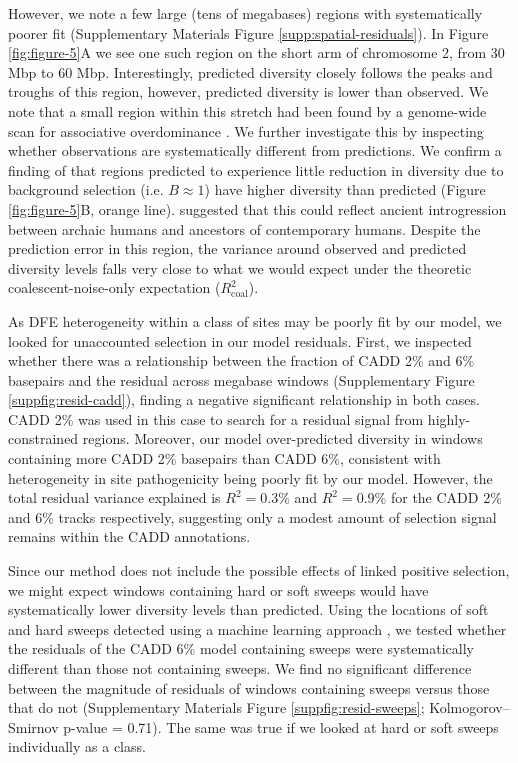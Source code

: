 \documentclass[11pt]{article}
\begin{document}
However, we note a few large (tens of megabases) regions with systematically poorer fit
(Supplementary Materials Figure \ref{supp:spatial-residuals}). In Figure
\ref{fig:figure-5}A we see one such region on the short arm of chromosome 2,
from 30 Mbp to 60 Mbp. Interestingly, predicted diversity closely follows the
peaks and troughs of this region, however, predicted diversity is lower than observed. We note that a small region within this stretch had been found by a genome-wide scan for associative overdominance \parencite{Gilbert2020-aw}. We further investigate this by inspecting whether observations are systematically different from predictions. We confirm a finding of \textcite{Murphy2022-sj} that regions predicted to experience little reduction in diversity due to background selection (i.e. $B\approx 1$) have higher diversity than predicted (Figure \ref{fig:figure-5}B, orange line). \textcite{Murphy2022-sj} suggested that this could reflect ancient introgression between archaic humans and ancestors of contemporary humans. Despite the prediction error in this region, the variance around observed and predicted diversity levels falls very close to what we would expect under the theoretic coalescent-noise-only expectation ($R_\text{coal}^2$).

As DFE heterogeneity within a class of sites may be poorly fit by our model,
we looked for unaccounted selection in our model residuals. First, we
inspected whether there was a relationship between the fraction of CADD 2\% and 6\% basepairs and the residual across megabase windows (Supplementary Figure
\ref{suppfig:resid-cadd}), finding a negative significant relationship in
both cases. CADD 2\% was used in this case to search for a residual signal from highly-constrained regions. Moreover, our model over-predicted diversity in windows containing
more CADD 2\% basepairs than CADD 6\%, consistent with heterogeneity in
site pathogenicity being poorly fit by our model. However, the total residual
variance explained is $R^2 = 0.3\%$ and $R^2 = 0.9\%$ for the CADD 2\% and 6\%
tracks respectively, suggesting only a modest amount of selection signal remains within the CADD annotations.

Since our method does not include the possible effects of linked positive
selection, we might expect windows containing hard or soft sweeps would have
systematically lower diversity levels than predicted. Using the locations of
soft and hard sweeps detected using a machine learning approach
\parencite{Schrider2016-xn, Schrider2017-yx}, we tested whether the residuals of the
CADD 6\% model containing sweeps were systematically different than those not
containing sweeps. We find no significant difference between the magnitude of
residuals of windows containing sweeps versus those that do not (Supplementary
Materials Figure \ref{suppfig:resid-sweeps}; Kolmogorov--Smirnov p-value =
0.71). The same was true if we looked at hard or soft sweeps individually as a class. 
\end{document}
